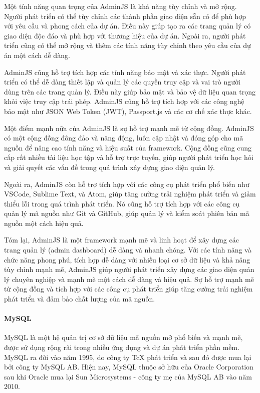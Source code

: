Một tính năng quan trọng của AdminJS là khả năng tùy chỉnh và mở rộng. Người phát triển có thể tùy chỉnh các thành phần giao diện sẵn có để phù hợp với yêu cầu và phong cách của dự án. Điều này giúp tạo ra các trang quản lý có giao diện độc đáo và phù hợp với thương hiệu của dự án. Ngoài ra, người phát triển cũng có thể mở rộng và thêm các tính năng tùy chỉnh theo yêu cầu của dự án một cách dễ dàng.

AdminJS cũng hỗ trợ tích hợp các tính năng bảo mật và xác thực. Người phát triển có thể dễ dàng thiết lập và quản lý các quyền truy cập và vai trò người dùng trên các trang quản lý. Điều này giúp bảo mật và bảo vệ dữ liệu quan trọng khỏi việc truy cập trái phép. AdminJS cũng hỗ trợ tích hợp với các công nghệ bảo mật như JSON Web Token (JWT), Passport.js và các cơ chế xác thực khác.

Một điểm mạnh nữa của AdminJS là sự hỗ trợ mạnh mẽ từ cộng đồng. AdminJS có một cộng đồng đông đảo và năng động, luôn cập nhật và đóng góp cho mã nguồn để nâng cao tính năng và hiệu suất của framework. Cộng đồng cũng cung cấp rất nhiều tài liệu học tập và hỗ trợ trực tuyến, giúp người phát triển học hỏi và giải quyết các vấn đề trong quá trình xây dựng giao diện quản lý.

Ngoài ra, AdminJS còn hỗ trợ tích hợp với các công cụ phát triển phổ biến như VSCode, Sublime Text, và Atom, giúp tăng cường trải nghiệm phát triển và giảm thiểu lỗi trong quá trình phát triển. Nó cũng hỗ trợ tích hợp với các công cụ quản lý mã nguồn như Git và GitHub, giúp quản lý và kiểm soát phiên bản mã nguồn một cách hiệu quả.

Tóm lại, AdminJS là một framework mạnh mẽ và linh hoạt để xây dựng các trang quản lý (admin dashboard) dễ dàng và nhanh chóng. Với các tính năng và chức năng phong phú, tích hợp dễ dàng với nhiều loại cơ sở dữ liệu và khả năng tùy chỉnh mạnh mẽ, AdminJS giúp người phát triển xây dựng các giao diện quản lý chuyên nghiệp và mạnh mẽ một cách dễ dàng và hiệu quả. Sự hỗ trợ mạnh mẽ từ cộng đồng và tích hợp với các công cụ phát triển giúp tăng cường trải nghiệm phát triển và đảm bảo chất lượng của mã nguồn.

\paragraph{MySQL}
\mbox{}

MySQL là một hệ quản trị cơ sở dữ liệu mã nguồn mở phổ biến và mạnh mẽ, được sử dụng rộng rãi trong nhiều ứng dụng và dự án phát triển phần mềm. MySQL ra đời vào năm 1995, do công ty TcX phát triển và sau đó được mua lại bởi công ty MySQL AB. Hiện nay, MySQL thuộc sở hữu của Oracle Corporation sau khi Oracle mua lại Sun Microsystems - công ty mẹ của MySQL AB vào năm 2010.

